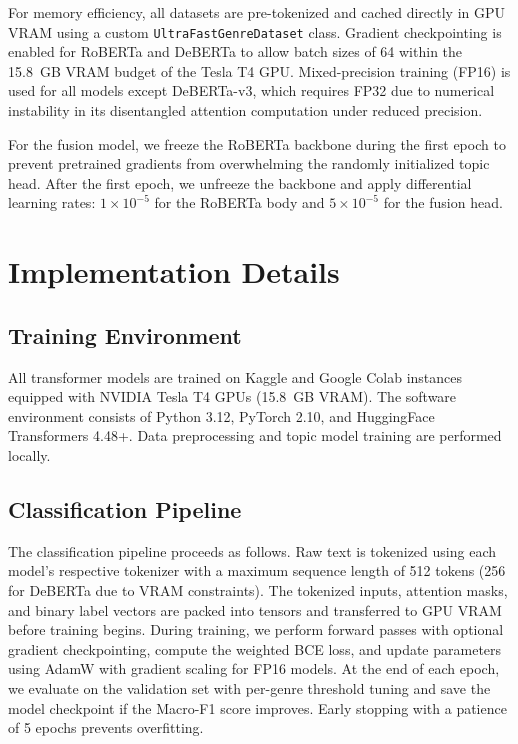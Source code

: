 \documentclass[11pt,a4paper]{article}
\begin{document}
For memory efficiency, all datasets are pre-tokenized and cached directly in GPU VRAM using a custom \texttt{UltraFastGenreDataset} class. Gradient checkpointing is enabled for RoBERTa and DeBERTa to allow batch sizes of 64 within the 15.8~GB VRAM budget of the Tesla T4 GPU. Mixed-precision training (FP16) is used for all models except DeBERTa-v3, which requires FP32 due to numerical instability in its disentangled attention computation under reduced precision.

For the fusion model, we freeze the RoBERTa backbone during the first epoch to prevent pretrained gradients from overwhelming the randomly initialized topic head. After the first epoch, we unfreeze the backbone and apply differential learning rates: $1 \times 10^{-5}$ for the RoBERTa body and $5 \times 10^{-5}$ for the fusion head.

\section{Implementation Details}

\subsection{Training Environment}

All transformer models are trained on Kaggle and Google Colab instances equipped with NVIDIA Tesla T4 GPUs (15.8~GB VRAM). The software environment consists of Python 3.12, PyTorch 2.10, and HuggingFace Transformers 4.48+. Data preprocessing and topic model training are performed locally.

\subsection{Classification Pipeline}

The classification pipeline proceeds as follows. Raw text is tokenized using each model's respective tokenizer with a maximum sequence length of 512 tokens (256 for DeBERTa due to VRAM constraints). The tokenized inputs, attention masks, and binary label vectors are packed into tensors and transferred to GPU VRAM before training begins. During training, we perform forward passes with optional gradient checkpointing, compute the weighted BCE loss, and update parameters using AdamW with gradient scaling for FP16 models. At the end of each epoch, we evaluate on the validation set with per-genre threshold tuning and save the model checkpoint if the Macro-F1 score improves. Early stopping with a patience of 5 epochs prevents overfitting.
\end{document}
